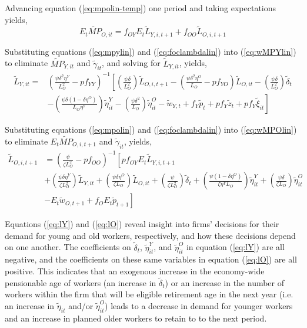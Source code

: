 \documentclass[11pt]{article}
\newcommand{\beq}{\begin{equation}}
\newcommand{\eeq}{\end{equation}}
\newcommand{\ds}{\displaystyle}
\begin{document}
Advancing equation (\ref{eq:mpolin-temp}) one period and taking expectations yields,
\beq \label{eq:mpolin} E_t \tilde{MP}_{O,it} = f_{OY} E_t \tilde{L}_{Y,i,t+1} + f_{OO} \tilde{L}_{O,i,t+1} \eeq

Substituting equations (\ref{eq:mpylin}) and (\ref{eq:foclambdalin}) into (\ref{eq:wMPYlin}) to eliminate $\tilde{MP}_{Y,it}$ and $\tilde{\gamma}_{it}$, and solving for $\tilde{L}_{Y,it}$, yields,
\beq \label{eq:lY} \begin{array}{ll}
  \tilde{L}_{Y,it} \ds = & \left(\ds\frac{\psi \delta^2 \eta^Y}{L_O^2} - p f_{YY}\right)^{-1} \ds \left[ \left(\frac{\psi \delta}{L_O^2}\right) \tilde{L}_{O,i,t+1} -  \left(\frac{\psi \delta^2 \eta^O}{L_O} - p f_{YO}\right) \tilde{L}_{O,it} - \left(\frac{\psi \delta}{L_O^2}\right) \tilde{\delta}_t  \right. \\ [1.5pc]
    & \ds \left. - \left(\frac{\psi \delta (1-\delta \eta^O)}{L_O \eta^Y}\right) \tilde{\eta}^Y_{it} - \left(\frac{\psi \delta^2}{L_O}\right) \tilde{\eta}^O_{it}  - \tilde{w}_{Y,t} + f_Y \tilde{p}_{t} + p f_Y \tilde{z}_t + p f_Y \tilde{\xi}_{it} \right]
\end{array} \eeq

Substituting equations (\ref{eq:mpolin}) and (\ref{eq:foclambdalin}) into (\ref{eq:wMPOlin}) to eliminate $E_t \tilde{MP}_{O,i,t+1}$ and $\tilde{\gamma}_{it}$, yields,
\beq \label{eq:lO} \begin{array}{ll} \ds  \tilde{L}_{O,i,t+1} & = \ds \left( \frac{\psi}{\zeta L_O^2} - p f_{OO} \right)^{-1} \left[ p f_{OY} E_t \tilde{L}_{Y,i,t+1} \right.\\ [1.5pc]
    & \ds \left. + \left(\frac{\psi \delta \eta^Y}{\zeta L_O^2}\right) \tilde{L}_{Y,it} +  \left(\frac{\psi \delta \eta^O}{\zeta L_O}\right) \tilde{L}_{O,it}  + \left( \frac{\psi}{\zeta L_O^2} \right) \tilde{\delta}_{t} + \left(\frac{\psi(1-\delta \eta^O)}{\zeta \eta^Y L_O}\right) \tilde{\eta}_{it}^Y + \left( \frac{\psi \delta}{\zeta L_O} \right)\tilde{\eta}_{it}^O \right. \\ [1.5pc]
    & \ds \left. - E_t \tilde{w}_{O,t+1} + f_O E_t \tilde{p}_{t+1} \right]
  \end{array} \eeq 

Equations (\ref{eq:lY}) and  (\ref{eq:lO}) reveal insight into firms' decisions for their demand for young and old workers, respectively, and how these decisions depend on one another.  The coefficients on $\tilde{\delta}_t$, $\tilde{\eta}^Y_{it}$, and $\tilde{\eta}^O_{it}$ in equation (\ref{eq:lY}) are all negative, and the coefficients on these same variables in equation (\ref{eq:lO}) are all positive. This indicates that an exogenous increase in the economy-wide pensionable age of workers (an increase in $\tilde{\delta}_t$) or an increase in the number of workers within the firm that will be eligible retirement age in the next year (i.e. an increase in $\tilde{\eta}_{it}$ and/or $\tilde{\eta}^O_{it}$) leads to a decrease in demand for younger workers and an increase in planned older workers to retain to to the next period.
\end{document}
